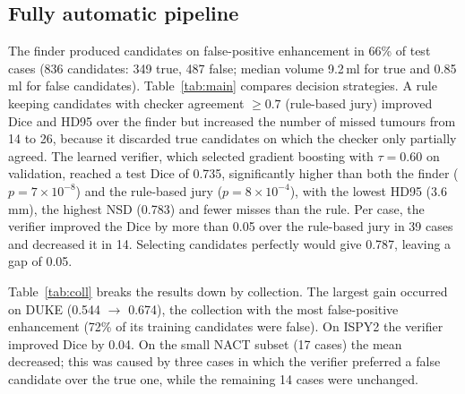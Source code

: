 \documentclass[journal]{IEEEtran}
\begin{document}
\subsection{Fully automatic pipeline}
The finder produced candidates on false-positive enhancement in 66\% of test cases (836 candidates: 349 true, 487 false; median volume 9.2\,ml for true and 0.85\,ml for false candidates). Table~\ref{tab:main} compares decision strategies. A rule keeping candidates with checker agreement $\ge0.7$ (rule-based jury) improved Dice and HD95 over the finder but increased the number of missed tumours from 14 to 26, because it discarded true candidates on which the checker only partially agreed. The learned verifier, which selected gradient boosting with $\tau=0.60$ on validation, reached a test Dice of 0.735, significantly higher than both the finder ($p=7\times10^{-8}$) and the rule-based jury ($p=8\times10^{-4}$), with the lowest HD95 (3.6\,mm), the highest NSD (0.783) and fewer misses than the rule. Per case, the verifier improved the Dice by more than 0.05 over the rule-based jury in 39 cases and decreased it in 14. Selecting candidates perfectly would give 0.787, leaving a gap of 0.05.

\begin{table}[t]
\centering
\caption{Fully automatic segmentation on the test set (306 cases) and validation Dice (120 cases). Oracle: all candidates that touch the tumour are kept.}
\label{tab:main}
\setlength{\tabcolsep}{3pt}
\end{table}

Table~\ref{tab:coll} breaks the results down by collection. The largest gain occurred on DUKE (0.544 $\rightarrow$ 0.674), the collection with the most false-positive enhancement (72\% of its training candidates were false). On ISPY2 the verifier improved Dice by 0.04. On the small NACT subset (17 cases) the mean decreased; this was caused by three cases in which the verifier preferred a false candidate over the true one, while the remaining 14 cases were unchanged.
\end{document}
